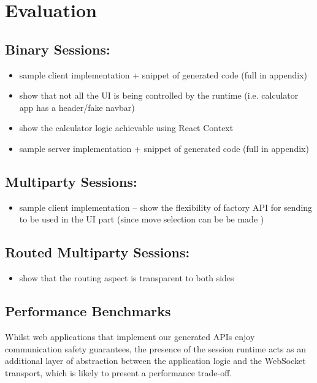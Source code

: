 \chapter{Evaluation}
\label{chap:eval}

\section{Binary Sessions: }
\begin{itemize}
\item sample client implementation + snippet of generated code (full in appendix)
\item show that not all the UI is being controlled by the runtime (i.e. calculator app has a header/fake navbar)
\item show the calculator logic achievable using React Context
\item sample server implementation + snippet of generated code (full in appendix)
\end{itemize}

\section{Multiparty Sessions: }
\begin{itemize}
\item sample client implementation -- show the flexibility of factory API for sending to be used in the UI part (since move selection can be be made )
\end{itemize}

\section{Routed Multiparty Sessions: }
\begin{itemize}
\item show that the routing aspect is transparent to both sides
\end{itemize}

\section{Performance Benchmarks}

Whilst web applications that implement our generated APIs enjoy
communication safety guarantees, the presence of the session runtime acts
as an additional layer of abstraction between the application logic and the
WebSocket transport, which is likely to present a performance trade-off.

